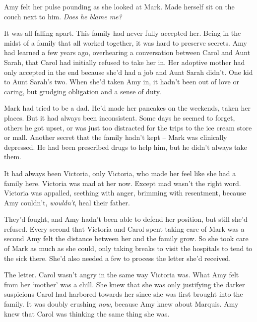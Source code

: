 Amy felt her pulse pounding as she looked at Mark.  Made herself sit on the couch next to him.  \emph{Does he blame me?}



It was all falling apart.  This family had never fully accepted her.  Being in the midst of a family that all worked together, it was hard to preserve secrets.  Amy had learned a few years ago, overhearing a conversation between Carol and Aunt Sarah, that Carol had initially refused to take her in.  Her adoptive mother had only accepted in the end because she'd had a job and Aunt Sarah didn't.  One kid to Aunt Sarah's two.  When she'd taken Amy in, it hadn't been out of love or caring, but grudging obligation and a sense of duty.



Mark had tried to be a dad.  He'd made her pancakes on the weekends, taken her places.  But it had always been inconsistent.  Some days he seemed to forget, others he got upset, or was just too distracted for the trips to the ice cream store or mall.  Another secret that the family hadn't kept – Mark was clinically depressed.  He had been prescribed drugs to help him, but he didn't always take them.



It had always been Victoria, only Victoria, who made her feel like she had a family here.  Victoria was mad at her now.  Except mad wasn't the right word.  Victoria was appalled, seething with anger, brimming with resentment, because Amy couldn't, \emph{wouldn't}, heal their father.



They'd fought, and Amy hadn't been able to defend her position, but still she'd refused.  Every second that Victoria and Carol spent taking care of Mark was a second Amy felt the distance between her and the family grow.  So she took care of Mark as much as she could, only taking breaks to visit the hospitals to tend to the sick there.  She'd also needed a few to process the letter she'd received.



The letter.  Carol wasn't angry in the same way Victoria was.  What Amy felt from her `mother' was a chill.  She knew that she was only justifying the darker suspicions Carol had harbored towards her since she was first brought into the family.  It was doubly crushing \emph{now}, because Amy knew about Marquis.  Amy knew that Carol was thinking the same thing she was.



